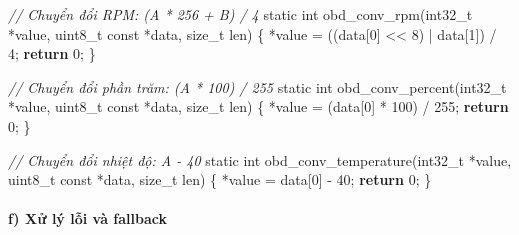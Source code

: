 \documentclass[a4paper]{extarticle}
\newenvironment{Shaded}{}{}
\newcommand{\CommentTok}[1]{\textcolor[rgb]{0.38,0.63,0.69}{\textit{#1}}}
\newcommand{\ControlFlowTok}[1]{\textcolor[rgb]{0.00,0.44,0.13}{\textbf{#1}}}
\newcommand{\DataTypeTok}[1]{\textcolor[rgb]{0.56,0.13,0.00}{#1}}
\newcommand{\DecValTok}[1]{\textcolor[rgb]{0.25,0.63,0.44}{#1}}
\newcommand{\NormalTok}[1]{#1}
\newcommand{\OperatorTok}[1]{\textcolor[rgb]{0.40,0.40,0.40}{#1}}
\begin{document}
\begin{Shaded}
\begin{Highlighting}[]
\CommentTok{// Chuyển đổi RPM: (A * 256 + B) / 4}
\DataTypeTok{static} \DataTypeTok{int}\NormalTok{ obd\_conv\_rpm}\OperatorTok{(}\DataTypeTok{int32\_t} \OperatorTok{*}\NormalTok{value}\OperatorTok{,} \DataTypeTok{uint8\_t} \DataTypeTok{const} \OperatorTok{*}\NormalTok{data}\OperatorTok{,} \DataTypeTok{size\_t}\NormalTok{ len}\OperatorTok{)}
\OperatorTok{\{}
    \OperatorTok{*}\NormalTok{value }\OperatorTok{=} \OperatorTok{((}\NormalTok{data}\OperatorTok{[}\DecValTok{0}\OperatorTok{]} \OperatorTok{\textless{}\textless{}} \DecValTok{8}\OperatorTok{)} \OperatorTok{|}\NormalTok{ data}\OperatorTok{[}\DecValTok{1}\OperatorTok{])} \OperatorTok{/} \DecValTok{4}\OperatorTok{;}
    \ControlFlowTok{return} \DecValTok{0}\OperatorTok{;}
\OperatorTok{\}}

\CommentTok{// Chuyển đổi phần trăm: (A * 100) / 255}
\DataTypeTok{static} \DataTypeTok{int}\NormalTok{ obd\_conv\_percent}\OperatorTok{(}\DataTypeTok{int32\_t} \OperatorTok{*}\NormalTok{value}\OperatorTok{,} \DataTypeTok{uint8\_t} \DataTypeTok{const} \OperatorTok{*}\NormalTok{data}\OperatorTok{,} \DataTypeTok{size\_t}\NormalTok{ len}\OperatorTok{)}
\OperatorTok{\{}
    \OperatorTok{*}\NormalTok{value }\OperatorTok{=} \OperatorTok{(}\NormalTok{data}\OperatorTok{[}\DecValTok{0}\OperatorTok{]} \OperatorTok{*} \DecValTok{100}\OperatorTok{)} \OperatorTok{/} \DecValTok{255}\OperatorTok{;}
    \ControlFlowTok{return} \DecValTok{0}\OperatorTok{;}
\OperatorTok{\}}

\CommentTok{// Chuyển đổi nhiệt độ: A {-} 40}
\DataTypeTok{static} \DataTypeTok{int}\NormalTok{ obd\_conv\_temperature}\OperatorTok{(}\DataTypeTok{int32\_t} \OperatorTok{*}\NormalTok{value}\OperatorTok{,} \DataTypeTok{uint8\_t} \DataTypeTok{const} \OperatorTok{*}\NormalTok{data}\OperatorTok{,} \DataTypeTok{size\_t}\NormalTok{ len}\OperatorTok{)}
\OperatorTok{\{}
    \OperatorTok{*}\NormalTok{value }\OperatorTok{=}\NormalTok{ data}\OperatorTok{[}\DecValTok{0}\OperatorTok{]} \OperatorTok{{-}} \DecValTok{40}\OperatorTok{;}
    \ControlFlowTok{return} \DecValTok{0}\OperatorTok{;}
\OperatorTok{\}}
\end{Highlighting}
\end{Shaded}

\paragraph{f) Xử lý lỗi và
fallback}\label{f-xux1eed-luxfd-lux1ed7i-vuxe0-fallback}
\end{document}
